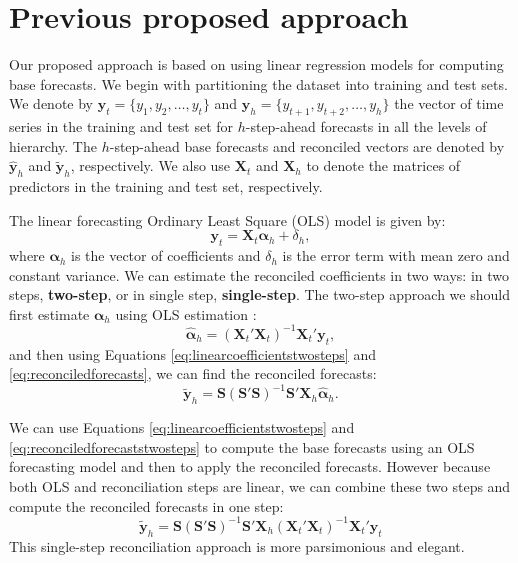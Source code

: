 \documentclass[11pt,a4paper,]{article}
\begin{document}

\hypertarget{previous-proposed-approach}{%
\section{Previous proposed approach}\label{previous-proposed-approach}}

Our proposed approach is based on using linear regression models for computing base forecasts. We begin with partitioning the dataset into training and test sets. We denote by \(\bm{y}_t=\{y_1,y_2,\dots,y_t\}\) and \(\bm{y}_h=\{y_{t+1},y_{t+2},\dots,y_h\}\) the vector of time series in the training and test set for \(h\)-step-ahead forecasts in all the levels of hierarchy. The \(h\)-step-ahead base forecasts and reconciled vectors are denoted by \(\hat{\bm{y}}_{h}\) and \(\tilde{\bm{y}}_{h}\), respectively. We also use \(\bm{X}_t\) and \(\bm{X}_h\) to denote the matrices of predictors in the training and test set, respectively.

The linear forecasting Ordinary Least Square (OLS) model is given by:
\begin{equation}\label{eq:linearmodel}
  \bm{y}_t = \bm{X}_t \bm{\alpha}_h+\delta_h,
\end{equation}
where \(\bm{\alpha}_h\) is the vector of coefficients and \(\delta_h\) is the error term with mean zero and constant variance. We can estimate the reconciled coefficients in two ways: in two steps, \textbf{two-step}, or in single step, \textbf{single-step}. The two-step approach we should first estimate \(\bm{\alpha}_h\) using OLS estimation :
\begin{equation}\label{eq:linearcoefficientstwosteps}
  \hat{\bm{\alpha}}_h = (\bm{X}_t'\bm{X}_t)^{-1}\bm{X}_t'\bm{y}_t,
\end{equation}
and then using Equations \eqref{eq:linearcoefficientstwosteps} and \eqref{eq:reconciledforecasts}, we can find the reconciled forecasts:
\begin{equation}\label{eq:reconciledforecaststwosteps}
  \tilde{\bm{y}}_h = \bm{S}(\bm{S}'\bm{S})^{-1}\bm{S}'\bm{X}_h\hat{\bm{\alpha}}_h.
\end{equation}

We can use Equations \eqref{eq:linearcoefficientstwosteps} and \eqref{eq:reconciledforecaststwosteps} to compute the base forecasts using an OLS forecasting model and then to apply the reconciled forecasts. However because both OLS and reconciliation steps are linear, we can combine these two steps and compute the reconciled forecasts in one step:
\begin{equation}\label{eq:reconciledforecastsonestep}
  \tilde{\bm{y}}_h = \bm{S}(\bm{S}'\bm{S})^{-1}\bm{S}'\bm{X}_h(\bm{X}_t'\bm{X}_t)^{-1}\bm{X}_t'\bm{y}_t
\end{equation}
This single-step reconciliation approach is more parsimonious and elegant.
\end{document}
